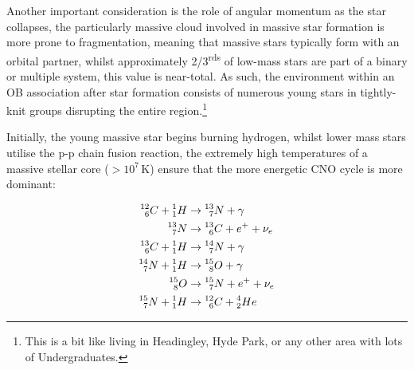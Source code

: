Another important consideration is the role of angular momentum as the star collapses, the particularly massive cloud involved in massive star formation is more prone to fragmentation, meaning that massive stars typically form with an orbital partner, whilst approximately 2/3\textsuperscript{rds} of low-mass stars are part of a binary or multiple system, this value is near-total. As such, the environment within an OB association after star formation consists of numerous young stars in tightly-knit groups disrupting the entire region.\footnote{This is a bit like living in Headingley, Hyde Park, or any other area with lots of Undergraduates.}


Initially, the young massive star begins burning hydrogen, whilst lower mass stars utilise the p-p chain fusion reaction, the extremely high temperatures of a massive stellar core ($>10^7 \, \si{\kelvin}$) ensure that the more energetic CNO cycle is more dominant:

\begin{subequations}
  \begin{align}
    \prescript{12}{6}{C} + \prescript{1}{1}{H} & \rightarrow \prescript{13}{7}{N} + \gamma \\ 
    \prescript{13}{7}{N} & \rightarrow \prescript{13}{6}{C} + e^+ + \nu_e \\
    \prescript{13}{6}{C} + \prescript{1}{1}{H} & \rightarrow \prescript{14}{7}{N} + \gamma \\
    \prescript{14}{7}{N} + \prescript{1}{1}{H} & \rightarrow \prescript{15}{8}{O} + \gamma \\
    \prescript{15}{8}{O} & \rightarrow \prescript{15}{7}{N} + e^+ + \nu_e \\
    \prescript{15}{7}{N} + \prescript{1}{1}{H} & \rightarrow \prescript{12}{6}{C} + \prescript{4}{2}{He} 
  \end{align}
\end{subequations}





